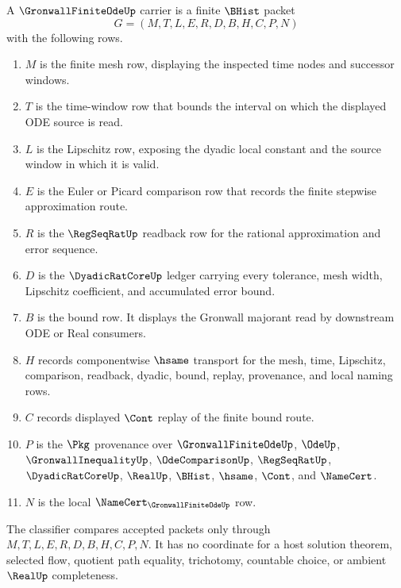 \begin{definition}
\label{def:gronwall-finite-ode-carrier}
A $\GronwallFiniteOdeUp$ carrier is a finite $\BHist$ packet
$$
G=(M,T,L,E,R,D,B,H,C,P,N)
$$
with the following rows.
\begin{enumerate}
\item $M$ is the finite mesh row, displaying the inspected time nodes and successor windows.
\item $T$ is the time-window row that bounds the interval on which the displayed ODE source is read.
\item $L$ is the Lipschitz row, exposing the dyadic local constant and the source window in which it is valid.
\item $E$ is the Euler or Picard comparison row that records the finite stepwise approximation route.
\item $R$ is the $\RegSeqRatUp$ readback row for the rational approximation and error sequence.
\item $D$ is the $\DyadicRatCoreUp$ ledger carrying every tolerance, mesh width, Lipschitz coefficient, and accumulated error bound.
\item $B$ is the bound row. It displays the Gronwall majorant read by downstream ODE or Real consumers.
\item $H$ records componentwise $\hsame$ transport for the mesh, time, Lipschitz, comparison, readback, dyadic, bound, replay, provenance, and local naming rows.
\item $C$ records displayed $\Cont$ replay of the finite bound route.
\item $P$ is the $\Pkg$ provenance over $\GronwallFiniteOdeUp$, $\OdeUp$, $\GronwallInequalityUp$, $\OdeComparisonUp$, $\RegSeqRatUp$, $\DyadicRatCoreUp$, $\RealUp$, $\BHist$, $\hsame$, $\Cont$, and $\NameCert$.
\item $N$ is the local $\NameCert_{\GronwallFiniteOdeUp}$ row.
\end{enumerate}
The classifier compares accepted packets only through $M,T,L,E,R,D,B,H,C,P,N$. It has no coordinate for a host solution theorem, selected flow, quotient path equality, trichotomy, countable choice, or ambient $\RealUp$ completeness.
\end{definition}

